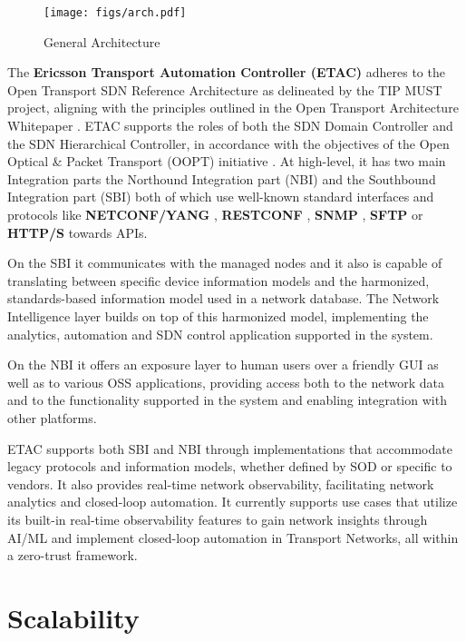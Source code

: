 \documentclass[10pt,sigconf]{iabart}
\begin{document}
\begin{figure}[h]
  \centering
  \texttt{[image: figs/arch.pdf]}
  \caption{General Architecture}
  \label{fig:overall_architecture}
\end{figure}

The \textbf{Ericsson Transport Automation Controller (ETAC)} \cite{ericsson-etac} adheres to the Open Transport SDN Reference Architecture as delineated by the TIP MUST project, aligning with the principles outlined in the Open Transport Architecture Whitepaper \cite{open_transport_architecture_whitepaper}. ETAC supports the roles of both the SDN Domain Controller and the SDN Hierarchical Controller, in accordance with the objectives of the Open Optical \& Packet Transport (OOPT) initiative \cite{oopt}. At high-level, it has two main Integration parts the Northound Integration part (NBI) and the Southbound Integration part (SBI) both of which use well-known standard interfaces and protocols like \textbf{NETCONF/YANG} \cite{RFC6241, rfc6020}, \textbf{RESTCONF} \cite{RFC8040}, \textbf{SNMP} \cite{RFC1157}, \textbf{SFTP} \cite{RFC4253} or \textbf{HTTP/S} \cite{RFC7230} towards APIs.

On the SBI it communicates with the managed nodes and it also is capable of translating between specific device information models and the harmonized, standards-based information model used in a network database. The Network Intelligence layer builds on top of this harmonized model, implementing the analytics, automation and SDN control application supported in the system. 

On the NBI it offers an exposure layer to human users over a friendly GUI as well as to various OSS applications, providing access both to the network data and to the functionality supported in the system and enabling integration with other platforms. 

ETAC supports both SBI and NBI through implementations that accommodate legacy protocols and information models, whether defined by SOD or specific to vendors. It also provides real-time network observability, facilitating network analytics and closed-loop automation. It currently supports use cases that utilize its built-in real-time observability features to gain network insights through AI/ML and implement closed-loop automation in Transport Networks, all within a zero-trust framework.


\section{Scalability} \label{scalability}
\end{document}
